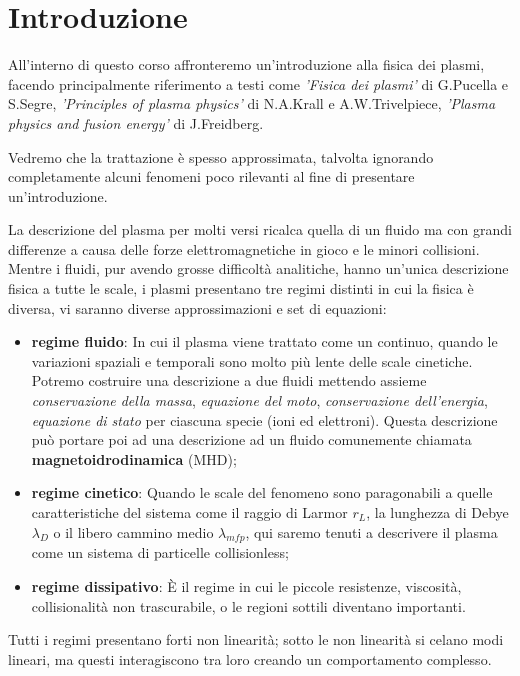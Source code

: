 \chapter{Introduzione}

All'interno di questo corso affronteremo un'introduzione alla fisica dei plasmi, facendo principalmente riferimento a testi come \emph{'Fisica dei plasmi'} di G.Pucella e S.Segre, \emph{'Principles of plasma physics'} di N.A.Krall e A.W.Trivelpiece, \emph{'Plasma physics and fusion energy'} di J.Freidberg.

Vedremo che la trattazione è spesso approssimata, talvolta ignorando completamente alcuni fenomeni poco rilevanti al fine di presentare un'introduzione. 

La descrizione del plasma per molti versi ricalca quella di un fluido ma con grandi differenze a causa delle forze elettromagnetiche in gioco e le minori collisioni.
Mentre i fluidi, pur avendo grosse difficoltà analitiche, hanno un’unica descrizione fisica a tutte le scale, i plasmi presentano tre regimi distinti in cui la fisica è diversa, vi saranno diverse approssimazioni e set di equazioni:

\begin{itemize}
	\item \textbf{regime fluido}: In cui il plasma viene trattato come un continuo, quando le variazioni spaziali e temporali sono molto più lente delle scale cinetiche. Potremo costruire una descrizione a due fluidi mettendo assieme \emph{conservazione della massa}, \emph{equazione del moto}, \emph{conservazione dell'energia}, \emph{equazione di stato} per ciascuna specie (ioni ed elettroni). Questa descrizione può portare poi ad una descrizione ad un fluido comunemente chiamata \textbf{magnetoidrodinamica} (MHD);
	\item \textbf{regime cinetico}: Quando le scale del fenomeno sono paragonabili a quelle caratteristiche del sistema come il raggio di Larmor $r_L$, la lunghezza di Debye $\lambda_D$ o il libero cammino medio $\lambda_{mfp}$, qui saremo tenuti a descrivere il plasma come un sistema di particelle collisionless;
	\item \textbf{regime dissipativo}: È il regime in cui le piccole resistenze, viscosità, collisionalità non trascurabile, o le regioni sottili diventano importanti.
\end{itemize}
\noindent Tutti i regimi presentano forti non linearità; sotto le non linearità si celano modi lineari, ma questi
interagiscono tra loro creando un comportamento complesso.



